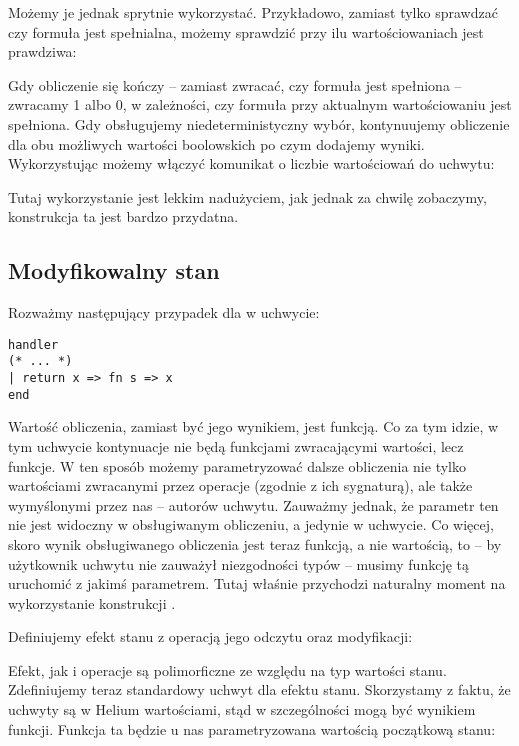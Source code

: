 Możemy je jednak sprytnie wykorzystać. Przykładowo, zamiast tylko sprawdzać czy formuła jest spełnialna, możemy sprawdzić przy ilu wartościowaniach jest prawdziwa:



Gdy obliczenie się kończy -- zamiast zwracać, czy formuła jest spełniona -- zwracamy 1 albo 0, w zależności, czy formuła przy aktualnym wartościowaniu jest spełniona. Gdy obsługujemy niedeterministyczny wybór, kontynuujemy obliczenie dla obu możliwych wartości boolowskich po czym dodajemy wyniki. Wykorzystując  możemy włączyć komunikat o liczbie wartościowań do uchwytu:



Tutaj wykorzystanie  jest lekkim nadużyciem, jak jednak za chwilę zobaczymy, konstrukcja ta jest bardzo przydatna.

\subsection{Modyfikowalny stan}

Rozważmy następujący przypadek dla  w uchwycie:

\begin{lstlisting}
handler
(* ... *)
| return x => fn s => x
end
\end{lstlisting}

Wartość obliczenia, zamiast być jego wynikiem, jest funkcją. Co za tym idzie, w tym uchwycie kontynuacje nie będą funkcjami zwracającymi wartości, lecz funkcje. W ten sposób możemy parametryzować dalsze obliczenia nie tylko wartościami zwracanymi przez operacje (zgodnie z ich sygnaturą), ale także wymyślonymi przez nas -- autorów uchwytu. Zauważmy jednak, że parametr ten nie jest widoczny w obsługiwanym obliczeniu, a jedynie w uchwycie. Co więcej, skoro wynik obsługiwanego obliczenia jest teraz funkcją, a nie wartością, to -- by użytkownik uchwytu nie zauważył niezgodności typów -- musimy funkcję tą uruchomić z jakimś parametrem. Tutaj właśnie przychodzi naturalny moment na wykorzystanie konstrukcji .

Definiujemy efekt stanu z operacją jego odczytu oraz modyfikacji:



Efekt, jak i operacje są polimorficzne ze względu na typ wartości stanu. Zdefiniujemy teraz standardowy uchwyt dla efektu stanu. Skorzystamy z faktu, że uchwyty są w Helium wartościami, stąd w szczególności mogą być wynikiem funkcji. Funkcja ta będzie u nas parametryzowana wartością początkową stanu:

